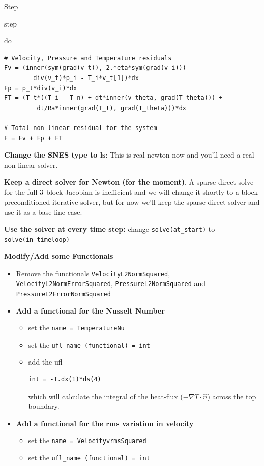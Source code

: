 \begin{steps}{Step}
\begin{steps}{step}
\begin{steps}{do}
\begin{lstlisting}[style=UFL]
# Velocity, Pressure and Temperature residuals
Fv = (inner(sym(grad(v_t)), 2.*eta*sym(grad(v_i))) - 
        div(v_t)*p_i - T_i*v_t[1])*dx
Fp = p_t*div(v_i)*dx
FT = (T_t*((T_i - T_n) + dt*inner(v_theta, grad(T_theta))) + 
         dt/Ra*inner(grad(T_t), grad(T_theta)))*dx

# Total non-linear residual for the system
F = Fv + Fp + FT
    \end{lstlisting}
  \item \textbf{Change the SNES type to ls}:  This is real newton now
    and you'll need a real non-linear solver.
  \item \textbf{Keep a direct solver for Newton (for the moment)}.  A
    sparse direct solve for the full $3\time3$ block Jacobian is
    inefficient and we will change it shortly to a
    block-preconditioned iterative solver, but for now we'll keep the
    sparse direct solver and use it as a base-line case.
    \end{steps}
  \item \textbf{Use the solver at every time step:} change
    \texttt{solve(at\_start)} to \texttt{solve(in\_timeloop)}
  \item \textbf{Modify/Add some Functionals}
    \begin{itemize}
    \item Remove the functionals \texttt{VelocityL2NormSquared},
      \texttt{VelocityL2NormErrorSquared},
      \texttt{PressureL2NormSquared} and
      \texttt{PressureL2ErrorNormSquared}
    \item \textbf{Add a functional for the Nusselt Number}
      \begin{itemize}
      \item set the \texttt{name = TemperatureNu}
      \item set the \texttt{ufl\_name (functional) = int}
      \item add the ufl
       \begin{lstlisting}[style=UFL]
         int = -T.dx(1)*ds(4)
       \end{lstlisting}
 which will calculate the integral of the heat-flux ($-\nabla T\cdot
 \hat{n}$) across the top boundary.
\end{itemize}
\item \textbf{Add a functional for the rms variation in velocity}
      \begin{itemize}
      \item set the \texttt{name = VelocityvrmsSquared}
      \item set the \texttt{ufl\_name (functional) = int}

\end{itemize}
\end{itemize}
\end{steps}
\end{steps}
